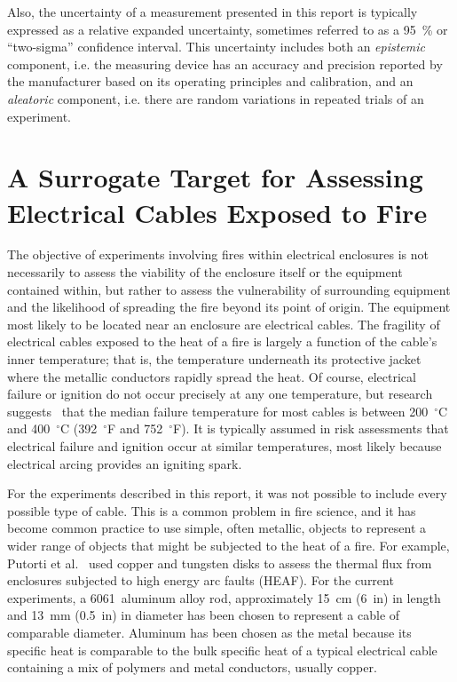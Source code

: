 Also, the uncertainty of a measurement presented in this report is typically expressed as a relative expanded uncertainty, sometimes referred to as a 95~\% or ``two-sigma'' confidence interval. This uncertainty includes both an {\em epistemic} component, i.e. the measuring device has an accuracy and precision reported by the manufacturer based on its operating principles and calibration, and an {\em aleatoric} component, i.e. there are random variations in repeated trials of an experiment.

\clearpage

\section{A Surrogate Target for Assessing Electrical Cables Exposed to Fire}
\label{cable_surrogate}

The objective of experiments involving fires within electrical enclosures is not necessarily to assess the viability of the enclosure itself or the equipment contained within, but rather to assess the vulnerability of surrounding equipment and the likelihood of spreading the fire beyond its point of origin. The equipment most likely to be located near an enclosure are electrical cables. The fragility of electrical cables exposed to the heat of a fire is largely a function of the cable's inner temperature; that is, the temperature underneath its protective jacket where the metallic conductors rapidly spread the heat. Of course, electrical failure or ignition do not occur precisely at any one temperature, but research suggests~\cite{CAROLFIRE} that the median failure temperature for most cables is between 200~$^\circ$C and 400~$^\circ$C (392~$^\circ$F and 752~$^\circ$F). It is typically assumed in risk assessments that electrical failure and ignition occur at similar temperatures, most likely because electrical arcing provides an igniting spark.

For the experiments described in this report, it was not possible to include every possible type of cable. This is a common problem in fire science, and it has become common practice to use simple, often metallic, objects to represent a wider range of objects that might be subjected to the heat of a fire. For example, Putorti et al.~\cite{Putorti:SMIRT23} used copper and tungsten disks to assess the thermal flux from enclosures subjected to high energy arc faults (HEAF). For the current experiments, a 6061~aluminum alloy rod, approximately  15~cm (6~in) in length and 13~mm (0.5~in) in diameter has been chosen to represent a cable of comparable diameter. Aluminum has been chosen as the metal because its specific heat is comparable to the bulk specific heat of a typical electrical cable containing a mix of polymers and metal conductors, usually copper. 

